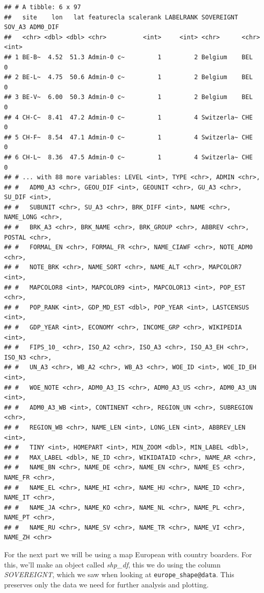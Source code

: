 \documentclass[
]{book}
\begin{document}
\begin{verbatim}
## # A tibble: 6 x 97
##   site    lon   lat featurecla scalerank LABELRANK SOVEREIGNT SOV_A3 ADM0_DIF
##   <chr> <dbl> <dbl> <chr>          <int>     <int> <chr>      <chr>     <int>
## 1 BE-B~  4.52  51.3 Admin-0 c~         1         2 Belgium    BEL           0
## 2 BE-L~  4.75  50.6 Admin-0 c~         1         2 Belgium    BEL           0
## 3 BE-V~  6.00  50.3 Admin-0 c~         1         2 Belgium    BEL           0
## 4 CH-C~  8.41  47.2 Admin-0 c~         1         4 Switzerla~ CHE           0
## 5 CH-F~  8.54  47.1 Admin-0 c~         1         4 Switzerla~ CHE           0
## 6 CH-L~  8.36  47.5 Admin-0 c~         1         4 Switzerla~ CHE           0
## # ... with 88 more variables: LEVEL <int>, TYPE <chr>, ADMIN <chr>,
## #   ADM0_A3 <chr>, GEOU_DIF <int>, GEOUNIT <chr>, GU_A3 <chr>, SU_DIF <int>,
## #   SUBUNIT <chr>, SU_A3 <chr>, BRK_DIFF <int>, NAME <chr>, NAME_LONG <chr>,
## #   BRK_A3 <chr>, BRK_NAME <chr>, BRK_GROUP <chr>, ABBREV <chr>, POSTAL <chr>,
## #   FORMAL_EN <chr>, FORMAL_FR <chr>, NAME_CIAWF <chr>, NOTE_ADM0 <chr>,
## #   NOTE_BRK <chr>, NAME_SORT <chr>, NAME_ALT <chr>, MAPCOLOR7 <int>,
## #   MAPCOLOR8 <int>, MAPCOLOR9 <int>, MAPCOLOR13 <int>, POP_EST <chr>,
## #   POP_RANK <int>, GDP_MD_EST <dbl>, POP_YEAR <int>, LASTCENSUS <int>,
## #   GDP_YEAR <int>, ECONOMY <chr>, INCOME_GRP <chr>, WIKIPEDIA <int>,
## #   FIPS_10_ <chr>, ISO_A2 <chr>, ISO_A3 <chr>, ISO_A3_EH <chr>, ISO_N3 <chr>,
## #   UN_A3 <chr>, WB_A2 <chr>, WB_A3 <chr>, WOE_ID <int>, WOE_ID_EH <int>,
## #   WOE_NOTE <chr>, ADM0_A3_IS <chr>, ADM0_A3_US <chr>, ADM0_A3_UN <int>,
## #   ADM0_A3_WB <int>, CONTINENT <chr>, REGION_UN <chr>, SUBREGION <chr>,
## #   REGION_WB <chr>, NAME_LEN <int>, LONG_LEN <int>, ABBREV_LEN <int>,
## #   TINY <int>, HOMEPART <int>, MIN_ZOOM <dbl>, MIN_LABEL <dbl>,
## #   MAX_LABEL <dbl>, NE_ID <chr>, WIKIDATAID <chr>, NAME_AR <chr>,
## #   NAME_BN <chr>, NAME_DE <chr>, NAME_EN <chr>, NAME_ES <chr>, NAME_FR <chr>,
## #   NAME_EL <chr>, NAME_HI <chr>, NAME_HU <chr>, NAME_ID <chr>, NAME_IT <chr>,
## #   NAME_JA <chr>, NAME_KO <chr>, NAME_NL <chr>, NAME_PL <chr>, NAME_PT <chr>,
## #   NAME_RU <chr>, NAME_SV <chr>, NAME_TR <chr>, NAME_VI <chr>, NAME_ZH <chr>
\end{verbatim}

For the next part we will be using a map European with country boarders. For this, we'll make an object called \emph{shp\_df}, this we do using the column \emph{SOVEREIGNT}, which we saw when looking at \texttt{europe\_shape@data}. This preserves only the data we need for further analysis and plotting.
\end{document}
